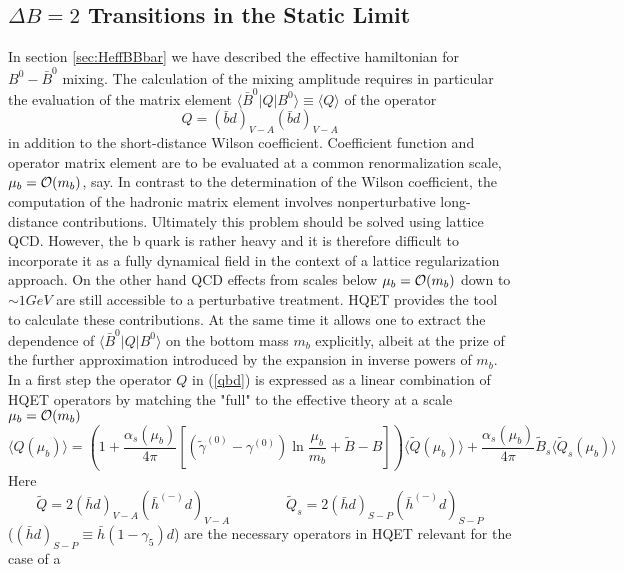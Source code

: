 \subsection{$\Delta B=2$ Transitions in the Static Limit}
\label{sec:HQET:DelB2}
In section \ref{sec:HeffBBbar} we have described the effective
hamiltonian for $B^0-\bar B^0$ mixing. The calculation of the mixing
amplitude requires in particular the evaluation of the matrix element
$\langle \bar B^0|Q|B^0\rangle\equiv\langle Q\rangle$ of the operator
\begin{equation}\label{qbd}
Q=(\bar bd)_{V-A}(\bar bd)_{V-A}
\end{equation}
in addition to the short-distance Wilson coefficient. Coefficient
function and operator matrix element are to be evaluated at a common
renormalization scale, $\mu_b={\cal O}(m_b)$, say. In contrast to the 
determination of the Wilson coefficient, the computation of the hadronic
matrix element involves nonperturbative long-distance contributions.
Ultimately this problem should be solved using lattice QCD. However,
the b quark is rather heavy and it is therefore difficult to
incorporate it as a fully dynamical field in the context of a
lattice regularization approach. On the other hand QCD effects from
scales below $\mu_b={\cal O}(m_b)$ down to $\sim 1GeV$ are still
accessible to a perturbative treatment. HQET provides the tool to
calculate these contributions. At the same time it allows one to
extract the dependence of $\langle \bar B^0|Q|B^0\rangle$ on the bottom
mass $m_b$ explicitly, albeit at the prize of the further
approximation introduced by the expansion in inverse powers of $m_b$.
\\
In a first step the operator $Q$ in (\ref{qbd}) is expressed as a
linear combination of HQET operators by matching the "full" to the
effective theory at a scale $\mu_b={\cal O}(m_b)$
\begin{equation}\label{qqtm}
\langle Q(\mu_b)\rangle=\left(1+\frac{\alpha_s(\mu_b)}{4\pi}
\left[(\tilde\gamma^{(0)}-\gamma^{(0)})\ln\frac{\mu_b}{m_b}+\tilde B-B
\right]\right)\langle\tilde Q(\mu_b)\rangle+
\frac{\alpha_s(\mu_b)}{4\pi}\tilde B_s \langle\tilde Q_s(\mu_b)\rangle
\end{equation}
Here 
\begin{equation}\label{qqst}
\tilde Q=2(\bar hd)_{V-A}(\bar h^{(-)}d)_{V-A}\qquad\qquad
\tilde Q_s=2(\bar hd)_{S-P}(\bar h^{(-)}d)_{S-P}
\end{equation}
($(\bar hd)_{S-P}\equiv\bar h(1-\gamma_5)d$)
are the necessary operators in HQET relevant for the case of a

